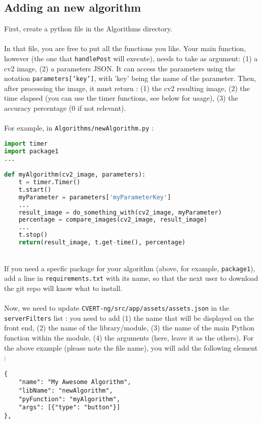 \documentclass[12pt,a4paper]{article}
\begin{document}
\subsection{Adding an new algorithm}
First, create a python file in the Algorithms directory.\\
~\\
In that file, you are free to put all the functions you like. Your main function, however (the one that \texttt{handlePost} will execute), needs to take as argument: (1) a cv2 image, (2) a parameters JSON. It can access the parameters using the notation \texttt{parameters['key']}, with 'key' being the name of the parameter. Then, after processing the image, it must return : (1) the cv2 resulting image, (2) the time elapsed (you can use the timer functions, see below for usage), (3) the accuracy percentage (0 if not relevant).\\
~\\
For example, in \texttt{Algorithms/newAlgorithm.py} :
\begin{lstlisting}[language=Python]
import timer
import package1
...

def myAlgorithm(cv2_image, parameters):
	t = timer.Timer()
	t.start()
	myParameter = parameters['myParameterKey']
	...
	result_image = do_something_with(cv2_image, myParameter)
	percentage = compare_images(cv2_image, result_image)
	...
	t.stop()
	return(result_image, t.get-time(), percentage)
\end{lstlisting}
~\\
If you need a specfic package for your algorithm (above, for example, \texttt{package1}), add a line in \texttt{requirements.txt} with its name, so that the next user to download the git repo will know what to install.\\
~\\
Now, we need to update \texttt{CVERT-ng/src/app/assets/assets.json} in the \texttt{serverFilters} list : you need to add (1) the name that will be displayed on the front end, (2) the name of the library/module, (3) the name of the main Python function within the module, (4) the arguments (here, leave it as the others). For the above example (please note the file name), you will add the following element :\\

\begin{lstlisting}
{
    "name": "My Awesome Algorithm",
    "libName": "newAlgorithm",
    "pyFunction": "myAlgorithm",
    "args": [{"type": "button"}]
},
\end{lstlisting}
\end{document}

